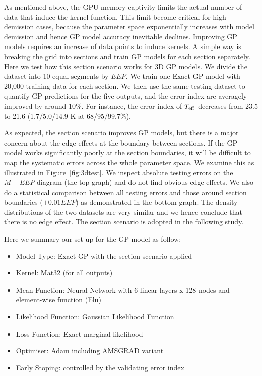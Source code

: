 As mentioned above, the GPU memory captivity limits the actual number of data that induce the kernel function.   
This limit become critical for high-demission cases, because the parameter space exponentially increases with model demission and hence GP model accuracy inevitable declines. Improving GP models requires an increase of data points to induce kernels. 
%
A simple way is breaking the grid into sections and train GP models for each section separately. 
Here we test how this section scenario works for 3D GP models. We divide the dataset into 10 equal segments by $EEP$. We train one Exact GP model with 20,000 training data for each section. We then use the same testing dataset to quantify GP predictions for the five outputs, and the error index are averagely improved by around 10\%. For instance, the error index of $T_{\rm eff}$ decreases from 23.5 to 21.6 (1.7/5.0/14.9 K at 68/95/99.7\%). 
%

As expected, the section scenario improves GP models, but there is a major concern about the edge effects at the boundary between sections. If the GP model works significantly poorly at the section boundaries, it will be difficult to map the systematic errors across the whole parameter space. We examine this as illustrated in Figure~\ref{fig:3dtest}. We inspect absolute testing errors on the $M-EEP$ diagram (the top graph) and do not find obvious edge effects. We also do a statistical comparison between all testing errors and those around section boundaries ($\pm0.01EEP$) as demonstrated in the bottom graph. The density distributions of the two datasets are very similar and we hence conclude that there is no edge effect. The section scenario is adopted in the following study.  

Here we summary our set up for the GP model as follow:
\begin{itemize}
\item Model Type: Exact GP with the section scenario applied
\item Kernel: Mat32 (for all outputs)
\item Mean Function: Neural Network with 6 linear layers x 128 nodes and element-wise function (Elu) 
\item Likelihood Function: Gaussian Likelihood Function
\item Loss Function: Exact marginal likelihood
\item Optimiser: Adam including AMSGRAD variant
\item Early Stoping: controlled by the validating error index
\end{itemize}







     





